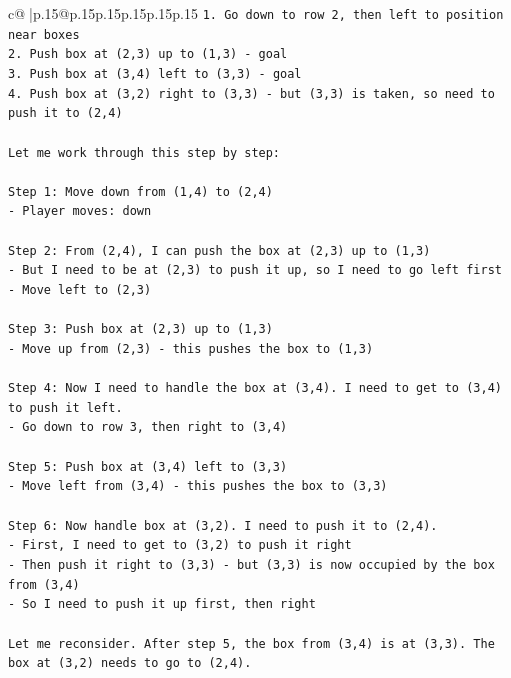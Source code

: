 \documentclass{article}
\begin{document}
{\begin{supertabular}{c@{$\;$}|p{.15\linewidth}@{}p{.15\linewidth}p{.15\linewidth}p{.15\linewidth}p{.15\linewidth}p{.15\linewidth}}
{{{\texttt{1. Go down to row 2, then left to position near boxes} \\
\texttt{2. Push box at (2,3) up to (1,3) {-} goal} \\
\texttt{3. Push box at (3,4) left to (3,3) {-} goal  } \\
\texttt{4. Push box at (3,2) right to (3,3) {-} but (3,3) is taken, so need to push it to (2,4)} \\
\\ 
\texttt{Let me work through this step by step:} \\
\\ 
\texttt{Step 1: Move down from (1,4) to (2,4)} \\
\texttt{{-} Player moves: down} \\
\\ 
\texttt{Step 2: From (2,4), I can push the box at (2,3) up to (1,3)} \\
\texttt{{-} But I need to be at (2,3) to push it up, so I need to go left first} \\
\texttt{{-} Move left to (2,3)} \\
\\ 
\texttt{Step 3: Push box at (2,3) up to (1,3)} \\
\texttt{{-} Move up from (2,3) {-} this pushes the box to (1,3)} \\
\\ 
\texttt{Step 4: Now I need to handle the box at (3,4). I need to get to (3,4) to push it left.} \\
\texttt{{-} Go down to row 3, then right to (3,4)} \\
\\ 
\texttt{Step 5: Push box at (3,4) left to (3,3)} \\
\texttt{{-} Move left from (3,4) {-} this pushes the box to (3,3)} \\
\\ 
\texttt{Step 6: Now handle box at (3,2). I need to push it to (2,4).} \\
\texttt{{-} First, I need to get to (3,2) to push it right} \\
\texttt{{-} Then push it right to (3,3) {-} but (3,3) is now occupied by the box from (3,4)} \\
\texttt{{-} So I need to push it up first, then right} \\
\\ 
\texttt{Let me reconsider. After step 5, the box from (3,4) is at (3,3). The box at (3,2) needs to go to (2,4).} \\
\\ 
}}}
\end{supertabular}}
\end{document}
